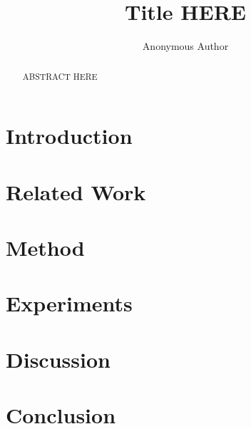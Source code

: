 \documentclass[a4paper,fleqn]{cas-sc}
\begin{document}
\let\WriteBookmarks\relax
\def\floatpagepagefraction{1}
\def\textpagefraction{.001}

\title [mode = title]{Title HERE}

\author{Anonymous Author}

\begin{abstract}
ABSTRACT HERE
\end{abstract}

\begin{keywords}
\end{keywords}

\maketitle

\section{Introduction}

\section{Related Work}

\section{Method}

\section{Experiments}

\section{Discussion}

\section{Conclusion}




\end{document}
